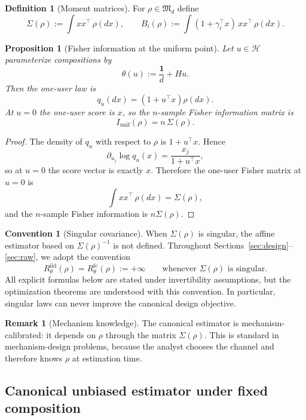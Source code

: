\documentclass[11pt]{amsart}
\newtheorem{proposition}[proposition]{Proposition}
\theoremstyle{definition}
\newtheorem{definition}[definition]{Definition}
\newtheorem{convention}[convention]{Convention}
\newtheorem{remark}[remark]{Remark}
\newcommand{\one}{\mathbf 1}
\newcommand{\cH}{\mathcal H}
\newcommand{\fM}{\mathfrak M}
\begin{document}
\begin{definition}[Moment matrices]
For $\rho\in\fM_d$ define
\[
\Sigma(\rho):=\int xx^\top\,\rho(dx),
\qquad
B_i(\rho):=\int (1+\gamma_i^\top x)\,xx^\top\,\rho(dx).
\]
\end{definition}

\begin{proposition}[Fisher information at the uniform point]\label{prop:fisher}
Let $u\in\cH$ parameterize compositions by
\[
\theta(u):=\frac{\one}{d}+Hu.
\]
Then the one-user law is
\[
q_u(dx)=(1+u^\top x)\rho(dx).
\]
At $u=0$ the one-user score is $x$, so the $n$-sample Fisher information matrix is
\[
I_{\mathrm{unif}}(\rho)=n\,\Sigma(\rho).
\]
\end{proposition}

\begin{proof}
The density of $q_u$ with respect to $\rho$ is $1+u^\top x$. Hence
\[
\partial_{u_j}\log q_u(x)=\frac{x_j}{1+u^\top x},
\]
so at $u=0$ the score vector is exactly $x$. Therefore the one-user Fisher matrix at $u=0$ is
\[
\int xx^\top\,\rho(dx)=\Sigma(\rho),
\]
and the $n$-sample Fisher information is $n\Sigma(\rho)$.
\end{proof}


\begin{convention}[Singular covariance]\label{rem:canonical-convention}
When $\Sigma(\rho)$ is singular, the affine estimator based on $\Sigma(\rho)^{-1}$ is not defined. Throughout Sections~\ref{sec:design}--\ref{sec:raw}, we adopt the convention
\[
R^{\mathrm{iid}}_\theta(\rho)=R^{\mathrm{fc}}_\theta(\rho):=+\infty
\qquad\text{whenever }\Sigma(\rho)\text{ is singular}.
\]
All explicit formulas below are stated under invertibility assumptions, but the optimization theorems are understood with this convention. In particular, singular laws can never improve the canonical design objective.
\end{convention}

\begin{remark}[Mechanism knowledge]
The canonical estimator is mechanism-calibrated: it depends on $\rho$ through the matrix $\Sigma(\rho)$. This is standard in mechanism-design problems, because the analyst chooses the channel and therefore knows $\rho$ at estimation time.
\end{remark}



\subsection{Canonical unbiased estimator under fixed composition}
\end{document}
